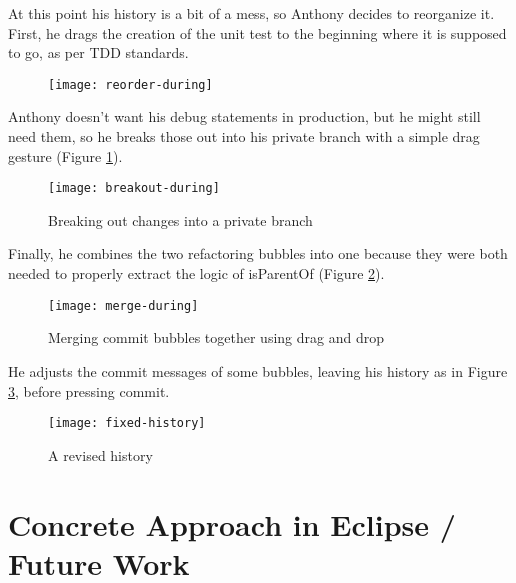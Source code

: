 \documentclass[conference]{IEEEtran}
\begin{document}
At this point his history is a bit of a mess, so Anthony decides to reorganize it.
First, he drags the creation of the unit test to the beginning where it is supposed to go, as per TDD standards.
\begin{figure}[h]
\centering
\texttt{[image: reorder-during]}
\end{figure}

Anthony doesn't want his debug statements in production, but he might still need them,
 so he breaks those out into his private branch with a simple drag gesture (Figure \ref{fig:private-branch}).
\begin{figure}[h]
\centering
\texttt{[image: breakout-during]}
\caption{Breaking out changes into a private branch}
\label{fig:private-branch}
\end{figure}

Finally, he combines the two refactoring bubbles into one because they were both needed to properly extract
the logic of isParentOf (Figure \ref{fig:merge}).
\begin{figure}[h]
\centering
\texttt{[image: merge-during]}
\caption{Merging commit bubbles together using drag and drop}
\label{fig:merge}
\end{figure}
He adjusts the commit messages of some bubbles, leaving his history as in Figure \ref{fig:fixed-history}, before pressing commit.

\begin{figure}[h]
\centering
\texttt{[image: fixed-history]}
\caption{A revised history}
\label{fig:fixed-history}
\end{figure}

\section{Concrete Approach in Eclipse / Future Work}
\end{document}
